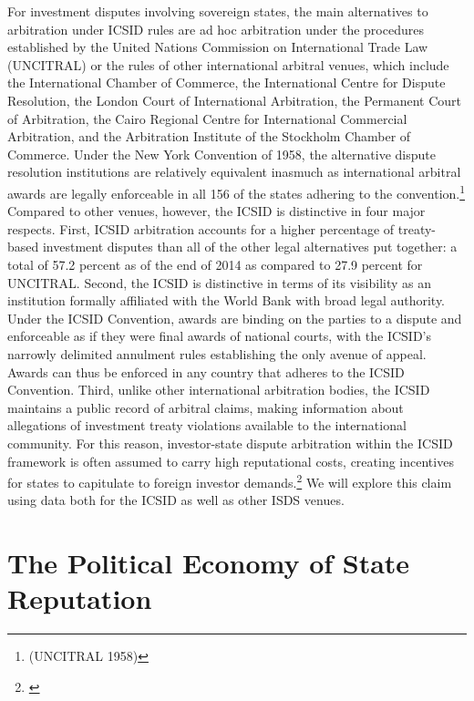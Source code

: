\documentclass[12pt,onesided]{amsart}
\begin{document}
For investment disputes involving sovereign states, the main alternatives to arbitration under ICSID rules are ad hoc arbitration under the procedures established by the United Nations Commission on International Trade Law (UNCITRAL) or the rules of other international arbitral venues, which include the International Chamber of Commerce, the International Centre for Dispute Resolution, the London Court of International Arbitration, the Permanent Court of Arbitration, the Cairo Regional Centre for International Commercial Arbitration, and the Arbitration Institute of the Stockholm Chamber of Commerce. Under the New York Convention of 1958,  the alternative dispute resolution institutions are relatively equivalent inasmuch as international arbitral awards are legally enforceable in all 156 of the states adhering to the convention.\footnote{(UNCITRAL 1958)} Compared to other venues, however, the ICSID is distinctive in four major respects. First,  ICSID arbitration accounts for a higher percentage of treaty-based investment disputes than all of the other legal alternatives put together: a total of 57.2 percent as of the end of 2014 as compared to 27.9 percent for UNCITRAL. Second, the ICSID is distinctive in terms of its visibility as an institution formally affiliated with the World Bank with broad legal authority. Under the ICSID Convention, awards are binding on the parties to a dispute and enforceable as if they were final awards of national courts, with the ICSID's narrowly delimited annulment rules establishing the only avenue of appeal. Awards can thus be enforced in any country that adheres to the ICSID Convention. Third, unlike other international arbitration bodies, the ICSID maintains a public record of arbitral claims, making information about allegations of investment treaty violations available to the international community. For this reason, investor-state dispute arbitration within the ICSID framework is often assumed to carry high reputational costs, creating incentives for states to capitulate to foreign investor demands.\footnote{\citet[p. 619]{trakman:2013}}  We will explore this claim using data both for the ICSID as well as other ISDS venues.

\section*{The Political Economy of State Reputation}
\end{document}
